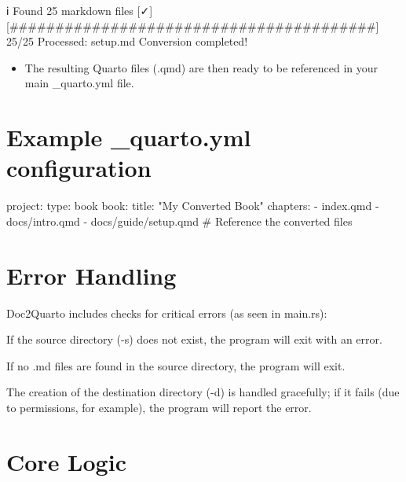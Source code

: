 \documentclass[
  letterpaper,
  DIV=11,
  numbers=noendperiod]{scrreprt}
\newenvironment{Shaded}{\begin{snugshade}}{\end{snugshade}}
\newcommand{\ExtensionTok}[1]{\textcolor[rgb]{0.00,0.23,0.31}{#1}}
\newcommand{\NormalTok}[1]{\textcolor[rgb]{0.00,0.23,0.31}{#1}}
\newcommand{\PreprocessorTok}[1]{\textcolor[rgb]{0.68,0.00,0.00}{#1}}
\newcommand{\SpecialStringTok}[1]{\textcolor[rgb]{0.13,0.47,0.30}{#1}}
\providecommand{\tightlist}{%
  \setlength{\itemsep}{0pt}\setlength{\parskip}{0pt}}
\begin{document}
\begin{Shaded}
\begin{Highlighting}[]
\ExtensionTok{ℹ}\NormalTok{ Found 25 markdown files}
\ExtensionTok{[✓]} \PreprocessorTok{[}\SpecialStringTok{\#\#\#\#\#\#\#\#\#\#\#\#\#\#\#\#\#\#\#\#\#\#\#\#\#\#\#\#\#\#\#\#\#\#\#\#\#\#\#\#}\PreprocessorTok{]}\NormalTok{ 25/25 Processed: setup.md}
\ExtensionTok{Conversion}\NormalTok{ completed!}
\end{Highlighting}
\end{Shaded}

\begin{itemize}
\tightlist
\item
  The resulting Quarto files (.qmd) are then ready to be referenced in
  your main \_quarto.yml file.
\end{itemize}

\chapter{Example \_quarto.yml
configuration}\label{example-_quarto.yml-configuration}

\begin{Shaded}
\begin{Highlighting}[]
\NormalTok{project:}
\NormalTok{  type: book}
\NormalTok{book:}
\NormalTok{  title: "My Converted Book"}
\NormalTok{  chapters:}
\NormalTok{    {-} index.qmd}
\NormalTok{    {-} docs/intro.qmd}
\NormalTok{    {-} docs/guide/setup.qmd \# Reference the converted files}
\end{Highlighting}
\end{Shaded}

\chapter{Error Handling}\label{error-handling}

Doc2Quarto includes checks for critical errors (as seen in main.rs):

If the source directory (-s) does not exist, the program will exit with
an error.

If no .md files are found in the source directory, the program will
exit.

The creation of the destination directory (-d) is handled gracefully; if
it fails (due to permissions, for example), the program will report the
error.

\chapter{Core Logic}\label{core-logic}
\end{document}
